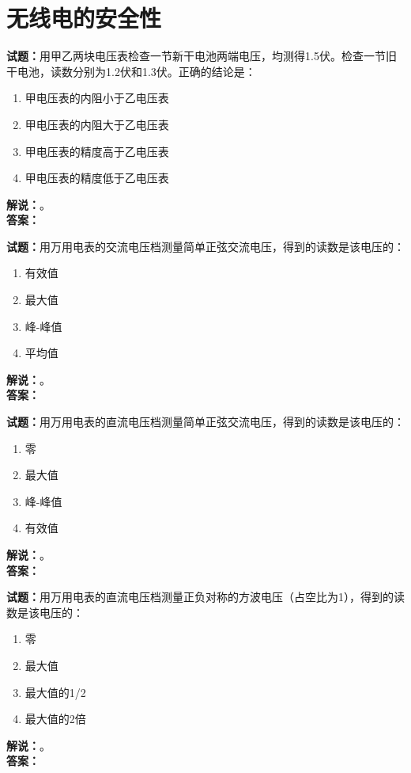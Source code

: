 \documentclass{ctexbook}
\begin{document}
\vspace{\baselineskip}

\chapter{无线电的安全性}

\newpage

\noindent\textbf{试题：}用甲乙两块电压表检查一节新干电池两端电压，均测得1.5伏。检查一节旧干电池，读数分别为1.2伏和1.3伏。正确的结论是：
\begin{enumerate}[leftmargin=3em]
  \item 甲电压表的内阻小于乙电压表
  \item 甲电压表的内阻大于乙电压表
  \item 甲电压表的精度高于乙电压表
  \item 甲电压表的精度低于乙电压表
\end{enumerate}
\noindent\textbf{解说：}\textbf{}。\\\noindent\textbf{答案：}

\vspace{\baselineskip}

\noindent\textbf{试题：}用万用电表的交流电压档测量简单正弦交流电压，得到的读数是该电压的：
\begin{enumerate}[leftmargin=3em]
  \item 有效值
  \item 最大值
  \item 峰-峰值
  \item 平均值
\end{enumerate}
\noindent\textbf{解说：}\textbf{}。\\\noindent\textbf{答案：}

\vspace{\baselineskip}

\noindent\textbf{试题：}用万用电表的直流电压档测量简单正弦交流电压，得到的读数是该电压的：
\begin{enumerate}[leftmargin=3em]
  \item 零
  \item 最大值
  \item 峰-峰值
  \item 有效值
\end{enumerate}
\noindent\textbf{解说：}\textbf{}。\\\noindent\textbf{答案：}

\vspace{\baselineskip}

\noindent\textbf{试题：}用万用电表的直流电压档测量正负对称的方波电压（占空比为1），得到的读数是该电压的：
\begin{enumerate}[leftmargin=3em]
  \item 零
  \item 最大值
  \item 最大值的1/2
  \item 最大值的2倍
\end{enumerate}
\noindent\textbf{解说：}\textbf{}。\\\noindent\textbf{答案：}
\end{document}
